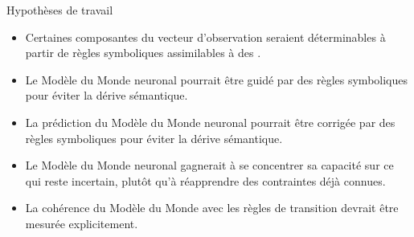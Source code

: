 \documentclass[aspectratio=169]{beamer}
\begin{document}
\begin{frame}{Hypothèses de travail}
  \scriptsize

  \vspace{0.12cm}
  \begin{itemize}
    \item Certaines composantes du vecteur d'observation seraient déterminables à partir de règles symboliques assimilables à des .

    \item Le Modèle du Monde neuronal pourrait être guidé par des règles symboliques pour éviter la dérive sémantique.

    \item La prédiction du Modèle du Monde neuronal pourrait être corrigée par des règles symboliques pour éviter la dérive sémantique.

    \item Le Modèle du Monde neuronal gagnerait à se concentrer sa capacité sur ce qui reste
          incertain, plutôt qu'à réapprendre des contraintes déjà connues.

    \item La cohérence du Modèle du Monde avec les règles de transition devrait être mesurée explicitement.
  \end{itemize}
\end{frame}
\end{document}
